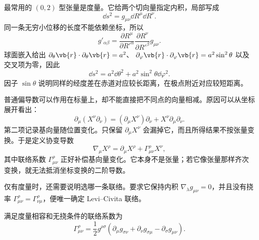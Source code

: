 最常用的 \((0,2)\) 型张量是度量。它给两个切向量指定内积，局部写成
\begin{equation}
\dd s^2=g_{\mu\nu}\dd R^\mu\dd R^\nu.
\label{eq:bh-metric-line-element}
\end{equation}
同一条无穷小位移的长度不能依赖坐标，所以
\begin{equation}
g'_{\alpha\beta}
=\frac{\partial R^\mu}{\partial R'^\alpha}
\frac{\partial R^\nu}{\partial R'^\beta}
g_{\mu\nu}.
\label{eq:bh-metric-transform}
\end{equation}
球面嵌入给出
\(
\partial_\theta\vb{r}\cdot\partial_\theta\vb{r}=a^2
\)、
\(
\partial_\varphi\vb{r}\cdot\partial_\varphi\vb{r}
=a^2\sin^2\theta
\)
以及交叉项为零，因此
\begin{equation}
\dd s^2=a^2\dd\theta^2+a^2\sin^2\theta\dd\varphi^2.
\label{eq:bh-sphere-metric}
\end{equation}
因子 \(\sin\theta\) 说明同样的经度差在赤道对应较长距离，在极点附近对应较短距离。

普通偏导数可以作用在标量上，却不能直接把不同点的向量相减。原因可以从坐标展开看出：
\[
\partial_\mu(X^\nu\partial_\nu)
=(\partial_\mu X^\nu)\partial_\nu
+X^\nu\partial_\mu\partial_\nu.
\]
第二项记录基向量随位置变化。只保留
\(\partial_\mu X^\nu\) 会漏掉它，而且所得结果不按张量变换。于是定义协变导数
\begin{equation}
\nabla_\mu X^\rho
=\partial_\mu X^\rho
+\Gamma^\rho_{\mu\nu}X^\nu,
\label{eq:bh-covariant-derivative-vector}
\end{equation}
其中联络系数 \(\Gamma^\rho_{\mu\nu}\) 正好补偿基向量变化。它本身不是张量；若它像张量那样齐次变换，就无法抵消坐标变换的二阶导数。

仅有度量时，还需要说明选哪一条联络。要求它保持内积
\(\nabla_\lambda g_{\mu\nu}=0\)，并且没有挠率
\(\Gamma^\rho_{\mu\nu}=\Gamma^\rho_{\nu\mu}\)，便唯一确定 Levi--Civita 联络。

\begin{theorem}
满足度量相容和无挠条件的联络系数为
\begin{equation}
\Gamma^\rho_{\mu\nu}
=\frac12g^{\rho\sigma}
\left(
\partial_\mu g_{\sigma\nu}
+\partial_\nu g_{\sigma\mu}
-\partial_\sigma g_{\mu\nu}
\right).
\label{eq:bh-christoffel-formula}
\end{equation}
\end{theorem}

